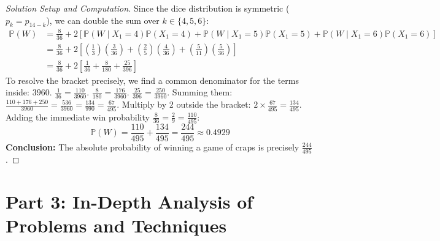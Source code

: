 \documentclass[12pt]{article}
\begin{document}
\begin{proof}[Solution Setup and Computation]
Since the dice distribution is symmetric ($p_k = p_{14-k}$), we can double the sum over $k \in \{4, 5, 6\}$:
\begin{align*}
    \mathbb{P}(W) &= \frac{8}{36} + 2 \left[ \mathbb{P}(W \mid X_1 = 4)\mathbb{P}(X_1 = 4) + \mathbb{P}(W \mid X_1 = 5)\mathbb{P}(X_1 = 5) + \mathbb{P}(W \mid X_1 = 6)\mathbb{P}(X_1 = 6) \right] \\
    &= \frac{8}{36} + 2 \left[ \left(\frac{1}{3}\right)\left(\frac{3}{36}\right) + \left(\frac{2}{5}\right)\left(\frac{4}{36}\right) + \left(\frac{5}{11}\right)\left(\frac{5}{36}\right) \right] \\
    &= \frac{8}{36} + 2 \left[ \frac{1}{36} + \frac{8}{180} + \frac{25}{396} \right]
\end{align*}
To resolve the bracket precisely, we find a common denominator for the terms inside: $3960$.
$\frac{1}{36} = \frac{110}{3960}$. \quad $\frac{8}{180} = \frac{176}{3960}$. \quad $\frac{25}{396} = \frac{250}{3960}$.
Summing them: $\frac{110 + 176 + 250}{3960} = \frac{536}{3960} = \frac{134}{990} = \frac{67}{495}$.
Multiply by 2 outside the bracket: $2 \times \frac{67}{495} = \frac{134}{495}$.
Adding the immediate win probability $\frac{8}{36} = \frac{2}{9} = \frac{110}{495}$:
\[ \mathbb{P}(W) = \frac{110}{495} + \frac{134}{495} = \frac{244}{495} \approx 0.4929 \]
\textbf{Conclusion:} The absolute probability of winning a game of craps is precisely $\frac{244}{495}$.
\end{proof}

\newpage
\section{Part 3: In-Depth Analysis of Problems and Techniques}
\end{document}

